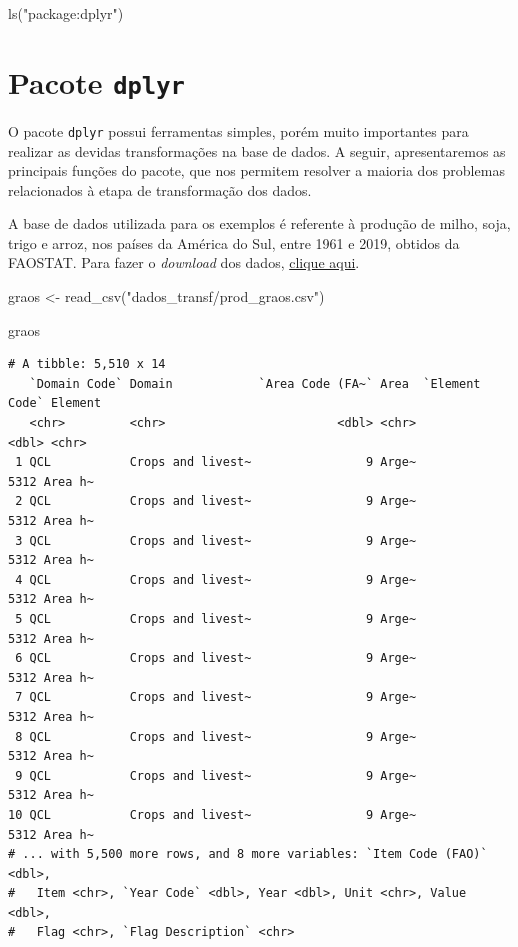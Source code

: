 \documentclass[
  brazilian,
]{book}
\newenvironment{Shaded}{\begin{snugshade}}{\end{snugshade}}
\newcommand{\FunctionTok}[1]{\textcolor[rgb]{0.00,0.00,0.00}{#1}}
\newcommand{\NormalTok}[1]{#1}
\newcommand{\OtherTok}[1]{\textcolor[rgb]{0.56,0.35,0.01}{#1}}
\newcommand{\StringTok}[1]{\textcolor[rgb]{0.31,0.60,0.02}{#1}}
\begin{document}
\begin{Shaded}
\begin{Highlighting}[]
\FunctionTok{ls}\NormalTok{(}\StringTok{"package:dplyr"}\NormalTok{)}
\end{Highlighting}
\end{Shaded}

\hypertarget{pacote-dplyr}{%
\section{\texorpdfstring{Pacote \texttt{dplyr}}{Pacote dplyr}}\label{pacote-dplyr}}

O pacote \texttt{dplyr} possui ferramentas simples, porém muito importantes para realizar as devidas transformações na base de dados. A seguir, apresentaremos as principais funções do pacote, que nos permitem resolver a maioria dos problemas relacionados à etapa de transformação dos dados.

A base de dados utilizada para os exemplos é referente à produção de milho, soja, trigo e arroz, nos países da América do Sul, entre 1961 e 2019, obtidos da FAOSTAT. Para fazer o \emph{download} dos dados, \href{https://github.com/gustavojy/ApostilaCD-R/blob/main/dados_zip/dados_transf.zip?raw=true}{clique aqui}.

\begin{Shaded}
\begin{Highlighting}[]
\NormalTok{graos }\OtherTok{\textless{}{-}} \FunctionTok{read\_csv}\NormalTok{(}\StringTok{"dados\_transf/prod\_graos.csv"}\NormalTok{)}

\NormalTok{graos}
\end{Highlighting}
\end{Shaded}

\begin{verbatim}
# A tibble: 5,510 x 14
   `Domain Code` Domain            `Area Code (FA~` Area  `Element Code` Element
   <chr>         <chr>                        <dbl> <chr>          <dbl> <chr>  
 1 QCL           Crops and livest~                9 Arge~           5312 Area h~
 2 QCL           Crops and livest~                9 Arge~           5312 Area h~
 3 QCL           Crops and livest~                9 Arge~           5312 Area h~
 4 QCL           Crops and livest~                9 Arge~           5312 Area h~
 5 QCL           Crops and livest~                9 Arge~           5312 Area h~
 6 QCL           Crops and livest~                9 Arge~           5312 Area h~
 7 QCL           Crops and livest~                9 Arge~           5312 Area h~
 8 QCL           Crops and livest~                9 Arge~           5312 Area h~
 9 QCL           Crops and livest~                9 Arge~           5312 Area h~
10 QCL           Crops and livest~                9 Arge~           5312 Area h~
# ... with 5,500 more rows, and 8 more variables: `Item Code (FAO)` <dbl>,
#   Item <chr>, `Year Code` <dbl>, Year <dbl>, Unit <chr>, Value <dbl>,
#   Flag <chr>, `Flag Description` <chr>
\end{verbatim}
\end{document}
